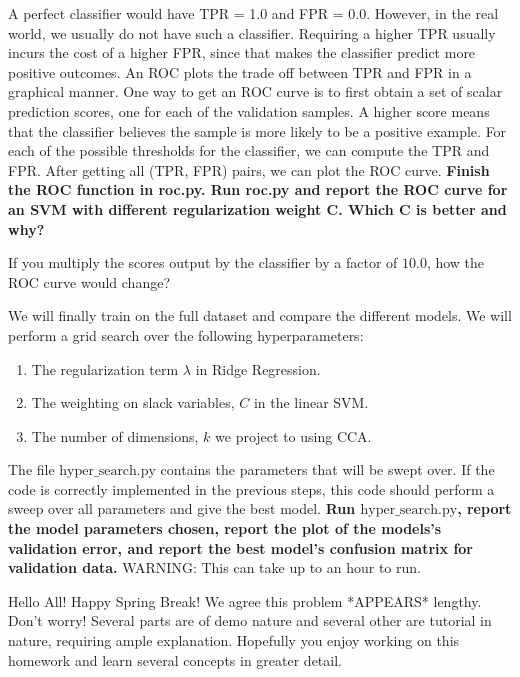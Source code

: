 \documentclass[preview]{standalone}
\begin{document}
\begin{Parts}
A perfect classifier would have TPR = 1.0 and FPR = 0.0. However, in
the real world, we usually do not have such a classifier. Requiring a
higher TPR usually incurs the cost of a higher FPR, since that makes
the classifier predict more positive outcomes. An ROC plots the trade
off between TPR and FPR in a graphical manner. One way to get an ROC
curve is to first obtain a set of scalar prediction scores, one for
each of the validation samples. A higher score means that the
classifier believes the sample is more likely to be a positive
example. For each of the possible thresholds for the classifier, we
can compute the TPR and FPR. After getting all (TPR, FPR) pairs, we
can plot the ROC curve. {\bf Finish the ROC function in roc.py. Run
  roc.py and report the ROC curve for an SVM with different regularization weight C. Which C is better and why?}




\Part If you multiply the scores output by the classifier by a factor of $10.0$, how the ROC curve would change?




 \Part We will finally train on the full dataset and compare the different models.  We will perform a grid search over the following hyperparameters:
 \begin{enumerate}
\item The regularization term $\lambda$ in Ridge Regression. 
\item The weighting on slack variables, $C$ in the linear SVM. 
\item The number of dimensions, $k$ we project to using CCA.
\end{enumerate} 

The file $\mbox{hyper\_search.py}$ contains the parameters that will
be swept over. If the code is correctly implemented in the previous
steps, this code should perform a sweep over all parameters and give
the best model. {\bf Run $\mbox{hyper\_search.py}$, report the model
  parameters chosen, report the plot of the models's validation error, and report the best model's confusion matrix for validation data.} WARNING: This can take up to an hour to run.






\end{Parts}


Hello All! Happy Spring Break!
We agree this problem *APPEARS* lengthy. Don't worry!
Several parts are of demo nature and several other
are tutorial in nature, requiring ample explanation.
Hopefully you enjoy working on this homework and learn
several concepts in greater detail.
\end{document}
